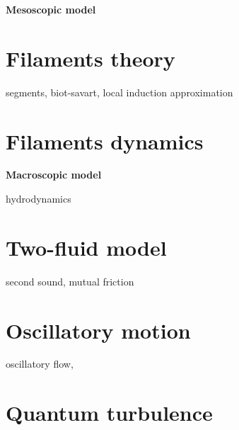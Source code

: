 \documentclass[a4paper, 12pt]{report}
\newcommand{\<}{\langle} %
\renewcommand{\>}{\rangle} %
\begin{document}
{\Huge \bfseries Mesoscopic model}
\vspace{0.3cm}

\section{Filaments theory}

segments, biot-savart, local induction approximation

\section{Filaments dynamics}

{\Huge \bfseries Macroscopic model}
\vspace{0.3cm}

hydrodynamics

\section{Two-fluid model}

second sound, mutual friction


\section{Oscillatory motion}

oscillatory flow, 

\section{Quantum turbulence}
\end{document}

